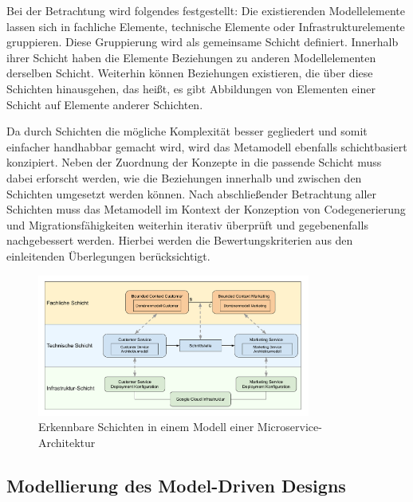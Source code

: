 Bei der Betrachtung wird folgendes festgestellt: Die existierenden Modellelemente lassen sich in fachliche Elemente, technische Elemente oder Infrastrukturelemente gruppieren. Diese Gruppierung wird als gemeinsame Schicht definiert. Innerhalb ihrer Schicht haben die Elemente Beziehungen zu anderen Modellelementen derselben Schicht. Weiterhin können Beziehungen existieren, die über diese Schichten hinausgehen, das heißt, es gibt Abbildungen von Elementen einer Schicht auf Elemente anderer Schichten.

Da durch Schichten die mögliche Komplexität besser gegliedert und somit einfacher handhabbar gemacht wird, wird das Metamodell ebenfalls schichtbasiert konzipiert. Neben der Zuordnung der Konzepte in die passende Schicht muss dabei erforscht werden, wie die Beziehungen innerhalb und zwischen den Schichten umgesetzt werden können. Nach abschließender Betrachtung aller Schichten muss das Metamodell im Kontext der Konzeption von Codegenerierung und Migrationsfähigkeiten weiterhin iterativ überprüft und gegebenenfalls nachgebessert werden. Hierbei werden die Bewertungskriterien aus den einleitenden Überlegungen berücksichtigt.

\begin{figure}[ht]
\centering
\includegraphics[width=0.8\textwidth]{bilder/k3/konzept.pdf}
\caption[Erkennbare Schichten in einem Modell einer Microservice-Architektur]{Erkennbare Schichten in einem Modell einer Microservice-Architektur}
\end{figure}


\subsection{Modellierung des Model-Driven Designs}

